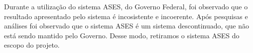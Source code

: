 
Durante a utilização do sistema ASES, do Governo Federal, foi observado que o resultado apresentado pelo sistema é incosistente e incoerente. Após pesquisas e análises foi observado que o sistema ASES é um sistema descontinuado, que não está sendo mantido pelo Governo. Desse modo, retiramos o sistema ASES do escopo do projeto.